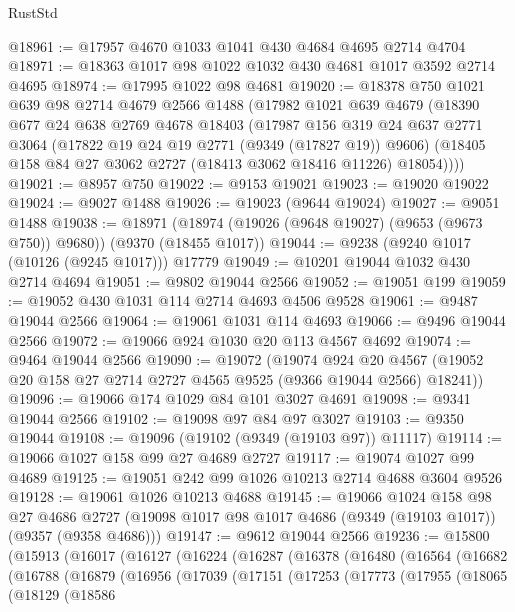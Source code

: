 \begin{lexlean}{RustStd}
\begin{coremodule}
{\begin{coremodule}
{{{{{{{{{{{{{{{{{{{{{{{{{{{{{{{{{{{{{{{@18961 := @17957 @4670 @1033 @1041 @430 @4684 @4695 @2714 @4704
@18971 := @18363 @1017 @98 @1022 @1032 @430 @4681 @1017 @3592 @2714 @4695
@18974 := @17995 @1022 @98 @4681
@19020 := @18378
    @750
    @1021
    @639
    @98
    @2714
    @4679
    @2566
    @1488
    (@17982
      @1021
      @639
      @4679
      (@18390
        @677
        @24
        @638
        @2769
        @4678
        @18403
        (@17987
          @156
          @319
          @24
          @637
          @2771
          @3064
          (@17822 @19 @24 @19 @2771 (@9349 (@17827 @19)) @9606)
          (@18405 @158 @84 @27 @3062 @2727 (@18413 @3062 @18416 @11226) @18054))))
@19021 := @8957 @750
@19022 := @9153 @19021
@19023 := @19020 @19022
@19024 := @9027 @1488
@19026 := @19023 (@9644 @19024)
@19027 := @9051 @1488
@19038 := @18971 (@18974 (@19026 (@9648 @19027) (@9653 (@9673 @750)) @9680)) (@9370 (@18455 @1017))
@19044 := @9238 (@9240 @1017 (@10126 (@9245 @1017))) @17779
@19049 := @10201 @19044 @1032 @430 @2714 @4694
@19051 := @9802 @19044 @2566
@19052 := @19051 @199
@19059 := @19052 @430 @1031 @114 @2714 @4693 @4506 @9528
@19061 := @9487 @19044 @2566
@19064 := @19061 @1031 @114 @4693
@19066 := @9496 @19044 @2566
@19072 := @19066 @924 @1030 @20 @113 @4567 @4692
@19074 := @9464 @19044 @2566
@19090 := @19072
    (@19074
      @924
      @20
      @4567
      (@19052 @20 @158 @27 @2714 @2727 @4565 @9525 (@9366 @19044 @2566) @18241))
@19096 := @19066 @174 @1029 @84 @101 @3027 @4691
@19098 := @9341 @19044 @2566
@19102 := @19098 @97 @84 @97 @3027
@19103 := @9350 @19044
@19108 := @19096 (@19102 (@9349 (@19103 @97)) @11117)
@19114 := @19066 @1027 @158 @99 @27 @4689 @2727
@19117 := @19074 @1027 @99 @4689
@19125 := @19051 @242 @99 @1026 @10213 @2714 @4688 @3604 @9526
@19128 := @19061 @1026 @10213 @4688
@19145 := @19066
    @1024
    @158
    @98
    @27
    @4686
    @2727
    (@19098 @1017 @98 @1017 @4686 (@9349 (@19103 @1017)) (@9357 (@9358 @4686)))
@19147 := @9612 @19044 @2566
@19236 := @15800
    (@15913
      (@16017
        (@16127
          (@16224
            (@16287
              (@16378
                (@16480
                  (@16564
                    (@16682
                      (@16788
                        (@16879
                          (@16956
                            (@17039
                              (@17151
                                (@17253
                                  (@17773
                                    (@17955
                                      (@18065
                                        (@18129
                                          (@18586
}}}}}}}}}}}}}}}}}}}}}}}}}}}}}}}}}}}}}}}
\end{coremodule}}
\end{coremodule}
\end{lexlean}
